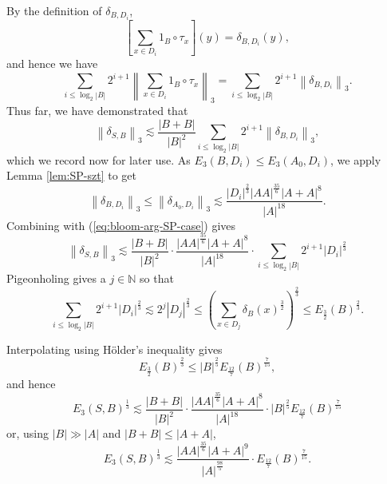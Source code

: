 \documentclass[reqno]{amsart}
\newcommand{\holder}{H\"older}
\numberwithin{equation}{section}
\begin{document}
By the definition of \(\delta_{B,D_{i} } \),
\[
    \left[ \sum _{x \in D_{i} } 1_{B} \circ \tau_{x} \right] (y) = \delta_{B,D_{i} } (y)
,\]
and hence we have
\[
    \sum _{i \leq \log _{2} \left\lvert B \right\rvert } 2^{i+1} \left\lVert \sum _{x \in D_{i} } 1_{B} \circ \tau_{x}  \right\rVert _{3} = \sum _{i \leq \log _{2} \left\lvert B \right\rvert } 2^{i+1} \left\lVert \delta_{B,D_{i} }  \right\rVert _{3} 
.\]
Thus far, we have demonstrated that
\begin{equation} \label{eq:bloom-arg-SP-case}
\left\lVert \delta_{S,B}  \right\rVert _{3}  \lesssim \frac{\left\lvert B+B \right\rvert }{\left\lvert B \right\rvert ^{2}} \sum _{i \leq \log _{2} \left\lvert B \right\rvert } 2^{i+1} \left\lVert \delta_{B,D_{i} }  \right\rVert _{3}   ,
\end{equation}
which we record now for later use. As \(E_3(B,D_{i} )\leq E_{3} (A_0,D_{i} )\), we apply Lemma \ref{lem:SP-szt}
to get
\[
    \left\lVert \delta_{B,D_{i} }  \right\rVert _{3} \leq  \left\lVert \delta_{A_0,D_{i} }  \right\rVert _{3}  \lesssim \frac{\left\lvert D_{i}  \right\rvert ^{\frac{2}{3} } \left\lvert AA \right\rvert ^{\frac{35}{6} } \left\lvert A + A \right\rvert ^{8}}{\left\lvert A \right\rvert ^{18}} 
.\]
Combining with (\ref{eq:bloom-arg-SP-case}) gives
\[
    \left\lVert \delta_{S,B}  \right\rVert _{3}  \lesssim \frac{\left\lvert B + B \right\rvert }{\left\lvert B \right\rvert ^{2}} \cdot \frac{ \left\lvert AA \right\rvert ^{\frac{35}{6} } \left\lvert A + A \right\rvert ^{8}}{\left\lvert A \right\rvert ^{18}} \cdot \sum _{i \leq \log _{2} \left\lvert B \right\rvert } 2^{i+1}\left\lvert D_{i}  \right\rvert ^{\frac{2}{3} }
\]
Pigeonholing gives a \(j \in \mathbb{N}  \) so that
\[
    \sum _{i \leq \log _{2} \left\lvert B \right\rvert } 2^{i+1} \left\lvert D_{i}  \right\rvert ^{\frac{2}{3} } \lesssim 2^{j} \left\lvert D_{j}  \right\rvert ^{\frac{2}{3} } \leq \left(  \sum _{x \in D_{j} } \delta_{B} (x) ^{\frac{3}{2} } \right) ^{\frac{2}{3} } \leq  E_{\frac{3}{2} } (B) ^{\frac{2}{3} }
.\]

Interpolating using \holder's inequality gives
\[
    E_{\frac{3}{2} } (B)^{\frac{2}{3} } \leq \left\lvert B \right\rvert ^{\frac{2}{5} }  E_{\frac{12}{7} } (B) ^{\frac{7}{15} }
,\]
and hence
\[
    E_{3} (S,B)^{\frac{1}{3} }\lesssim \frac{\left\lvert B+B \right\rvert }{\left\lvert B \right\rvert ^{2}} \cdot  \frac{ \left\lvert AA \right\rvert ^{\frac{35}{6} } \left\lvert A + A \right\rvert ^{8}}{\left\lvert A \right\rvert ^{18}}\cdot \left\lvert B \right\rvert ^{\frac{2}{5} }E_{\frac{12}{7} } (B)^{\frac{7}{15} }
\]
or, using \(\left\lvert B \right\rvert \gg \left\lvert A \right\rvert \) and \(\left\lvert B+B \right\rvert \leq \left\lvert A+A \right\rvert \),
\begin{equation} \label{eq:third-term-resolved}
   E_3(S,B)^{\frac{1}{3} }\lesssim \frac{\left\lvert AA \right\rvert ^{\frac{35}{6} }\left\lvert A+A \right\rvert ^{9}}{\left\lvert A \right\rvert ^{\frac{98}{5} }} \cdot E_{\frac{12}{7} } (B)^{\frac{7}{15} }.
\end{equation}
\end{document}
